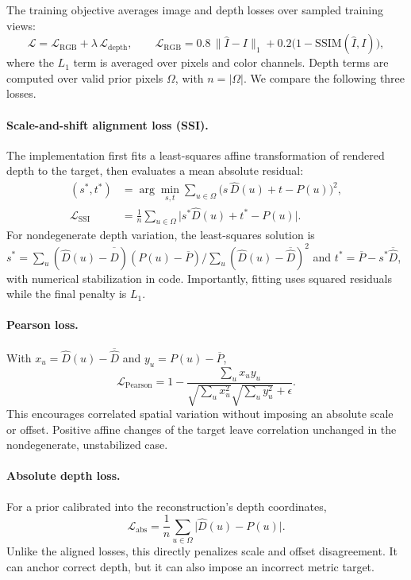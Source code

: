 \documentclass[10pt,a4paper]{article}
\begin{document}
The training objective averages image and depth losses over sampled training views:
\begin{equation}
\mathcal{L}=\mathcal{L}_{\mathrm{RGB}}+\lambda\,\mathcal{L}_{\mathrm{depth}},\qquad
\mathcal{L}_{\mathrm{RGB}}=0.8\,\|\widehat{I}-I\|_1+0.2\bigl(1-\mathrm{SSIM}(\widehat{I},I)\bigr),
\end{equation}
where the $L_1$ term is averaged over pixels and color channels. Depth terms are
computed over valid prior pixels $\Omega$, with $n=|\Omega|$. We compare the following
three losses.

\paragraph{Scale-and-shift alignment loss (SSI).} The implementation first fits a
least-squares affine transformation of rendered depth to the target, then evaluates a
mean absolute residual:
\begin{align}
(s^*,t^*)&=\arg\min_{s,t}\sum_{u\in\Omega}\bigl(s\,\widehat{D}(u)+t-P(u)\bigr)^2,\\
\mathcal{L}_{\mathrm{SSI}}&=\frac{1}{n}\sum_{u\in\Omega}\bigl|s^*\widehat{D}(u)+t^*-P(u)\bigr|.
\end{align}
For nondegenerate depth variation, the least-squares solution is
$s^*=\sum_u(\widehat{D}(u)-\overline{\widehat{D}})(P(u)-\overline{P})/\sum_u(\widehat{D}(u)-\overline{\widehat{D}})^2$
and $t^*=\overline{P}-s^*\overline{\widehat{D}}$, with numerical stabilization in
code. Importantly, fitting uses squared residuals while the final penalty is $L_1$.

\paragraph{Pearson loss.} With $x_u=\widehat{D}(u)-\overline{\widehat{D}}$ and
$y_u=P(u)-\overline{P}$,
\begin{equation}
\mathcal{L}_{\mathrm{Pearson}}=1-\frac{\sum_u x_u y_u}{\sqrt{\sum_u x_u^2}\sqrt{\sum_u y_u^2}+\epsilon}.
\end{equation}
This encourages correlated spatial variation without imposing an absolute scale or
offset. Positive affine changes of the target leave correlation unchanged in the
nondegenerate, unstabilized case.

\paragraph{Absolute depth loss.} For a prior calibrated into the reconstruction's
depth coordinates,
\begin{equation}
\mathcal{L}_{\mathrm{abs}}=\frac{1}{n}\sum_{u\in\Omega}\bigl|\widehat{D}(u)-P(u)\bigr|.
\end{equation}
Unlike the aligned losses, this directly penalizes scale and offset disagreement. It
can anchor correct depth, but it can also impose an incorrect metric target.
\end{document}
